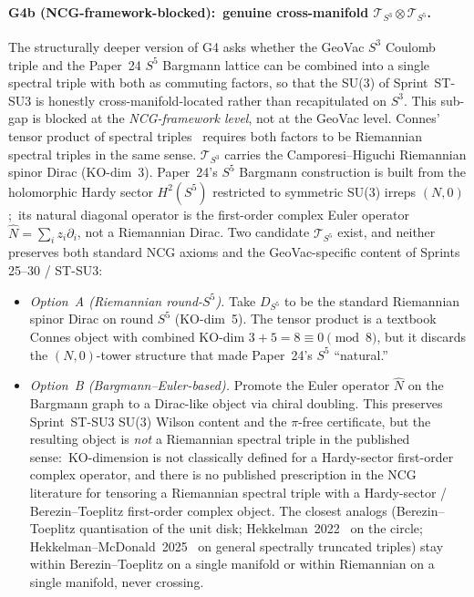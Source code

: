 \documentclass[11pt]{article}
\begin{document}
\paragraph{G4b (NCG-framework-blocked):\ genuine cross-manifold
$\mathcal{T}_{S^3} \otimes \mathcal{T}_{S^5}$.}  The structurally
deeper version of G4 asks whether the GeoVac $S^3$ Coulomb triple
and the Paper~24 $S^5$ Bargmann lattice can be combined into a
single spectral triple with both as commuting factors, so that the
SU(3) of Sprint~ST-SU3 is honestly cross-manifold-located rather
than recapitulated on $S^3$.  This sub-gap is blocked at the
\emph{NCG-framework level}, not at the GeoVac level.  Connes' tensor
product of spectral triples~\cite{connes_marcolli2008} requires
both factors to be Riemannian spectral triples in the same sense.
$\mathcal{T}_{S^3}$ carries the Camporesi--Higuchi Riemannian spinor
Dirac (KO-dim~3).  Paper~24's $S^5$ Bargmann construction is built
from the holomorphic Hardy sector $H^2(S^5)$ restricted to symmetric
SU(3) irreps $(N, 0)$;\ its natural diagonal operator is the
first-order complex Euler operator
$\hat{N} = \sum_i z_i \partial_i$, not a Riemannian Dirac.  Two
candidate $\mathcal{T}_{S^5}$ exist, and neither preserves both
standard NCG axioms and the GeoVac-specific content of Sprints
25--30 / ST-SU3:

\begin{itemize}\setlength{\itemsep}{2pt}
\item \emph{Option~A (Riemannian round-$S^5$).}  Take $D_{S^5}$ to
be the standard Riemannian spinor Dirac on round $S^5$ (KO-dim~5).
The tensor product is a textbook Connes object with combined
KO-dim $3 + 5 = 8 \equiv 0 \pmod 8$, but it discards the
$(N, 0)$-tower structure that made Paper~24's $S^5$ ``natural.''
\item \emph{Option~B (Bargmann--Euler-based).}  Promote the Euler
operator $\hat{N}$ on the Bargmann graph to a Dirac-like object via
chiral doubling.  This preserves Sprint~ST-SU3 SU(3) Wilson content
and the $\pi$-free certificate, but the resulting object is
\emph{not} a Riemannian spectral triple in the published sense:\
KO-dimension is not classically defined for a Hardy-sector
first-order complex operator, and there is no published prescription
in the NCG literature for tensoring a Riemannian spectral triple
with a Hardy-sector / Berezin--Toeplitz first-order complex object.
The closest analogs (Berezin--Toeplitz quantisation of the unit disk;
Hekkelman~2022~\cite{hekkelman2022} on the circle;
Hekkelman--McDonald~2025~\cite{hekkelman_mcdonald2024} on general
spectrally truncated triples)
stay within Berezin--Toeplitz on a single manifold or within
Riemannian on a single manifold, never crossing.
\end{itemize}
\end{document}
